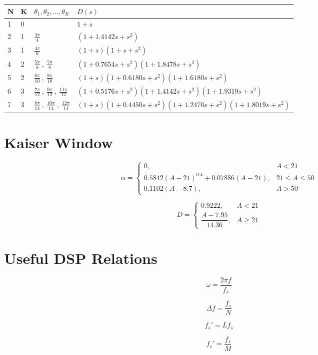 \begin{tabular}{|l|l|l|l|}
	\hline
	N & K & $\theta_1,\theta_2,\ldots,\theta_K$ & $D(s)$ \\ \hline
	1 & 0 & & $1+s$ \\ \hline
	2 & 1 & $\frac{3\pi}{4}$ & $(1 + 1.4142s + s^2)$ \\ \hline
	3 & 1 & $\frac{4\pi}{6}$ & $(1+s)(1+s+s^2)$ \\ \hline
	4 & 2 & $\frac{5\pi}{8}\:,\:\frac{7\pi}{8}$ & $(1+0.7654s+s^2)(1+1.8478s+s^2)$ \\ \hline
	5 & 2 & $\frac{6\pi}{10}\:,\:\frac{8\pi}{10}$ & $(1+s)(1+0.6180s+s^2)(1+1.6180s+s^2)$ \\ \hline
	6 & 3 & $\frac{7\pi}{12}\:,\:\frac{9\pi}{12}\:,\:\frac{11\pi}{12}$ & $(1+0.5176s+s^2)(1+1.4142s+s^2)(1+1.9319s+s^2)$ \\ \hline
	7 & 3 & $\frac{8\pi}{14}\:,\:\frac{10\pi}{14}\:,\:\frac{12\pi}{14}$ & $(1+s)(1+0.4450s+s^2)(1+1.2470s+s^2)(1+1.8019s+s^2)$ \\ \hline
\end{tabular}
\section{Kaiser Window}

\[
\alpha=
\begin{cases}
0,&A<21\\[1mm]
0.5842(A-21)^{0.4}
+0.07886(A-21),
&
21\le A\le50\\[1mm]
0.1102(A-8.7),
&
A>50
\end{cases}
\]

\vspace{2mm}

\[
D=
\begin{cases}
0.9222,&A<21\\
\dfrac{A-7.95}{14.36},&A\ge21
\end{cases}
\]

\section{Useful DSP Relations}

\[
\omega=\frac{2\pi f}{f_s}
\]

\[
\Delta f=\frac{f_s}{N}
\]

\[
f_s'=Lf_s
\]

\[
f_s'=\frac{f_s}{M}
\]

